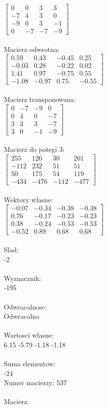 \documentclass[a4paper,12pt]{article}
\begin{document}
$\begin{bmatrix} 0&0&3&3\\-7&4&3&0\\-9&0&3&-1\\0&-7&-7&-9 \end{bmatrix}$
\\
\\
Macierz odwrotna:\\

$\begin{bmatrix} 0.59&0.43&-0.45&0.25\\-0.03&0.28&-0.22&0.02\\1.41&0.97&-0.75&0.55\\-1.08&-0.97&0.75&-0.55 \end{bmatrix}$
\\
\\
Macierz transponowana:\\

$\begin{bmatrix} 0&-7&-9&0\\0&4&0&-7\\3&3&3&-7\\3&0&-1&-9 \end{bmatrix}$
\\
\\
Macierz do potegi 3:\\

$\begin{bmatrix} 255&126&30&201\\-112&232&51&51\\50&175&54&119\\-434&-476&-112&-477 \end{bmatrix}$
\\
\\
Wektory wlasne:\\

$\begin{bmatrix} -0.07&-0.34&-0.38&-0.38\\0.76&-0.17&-0.23&-0.23\\0.38&-0.24&-0.53&-0.53\\-0.52&0.89&0.68&0.68 \end{bmatrix}$
\\
\\
Slad:\\
-2
\\
\\
Wyznacznik:\\
-195
\\
\\
Odwracalnosc:\\
Odwracalna
\\
\\
Wartosci wlasne:\\
6.15 -5.79 -1.18 -1.18
\\
\\
Suma elementow:\\
-24
\\
\newpage
Numer macierzy:
537
\\
\\
Macierz:\\
\end{document}
